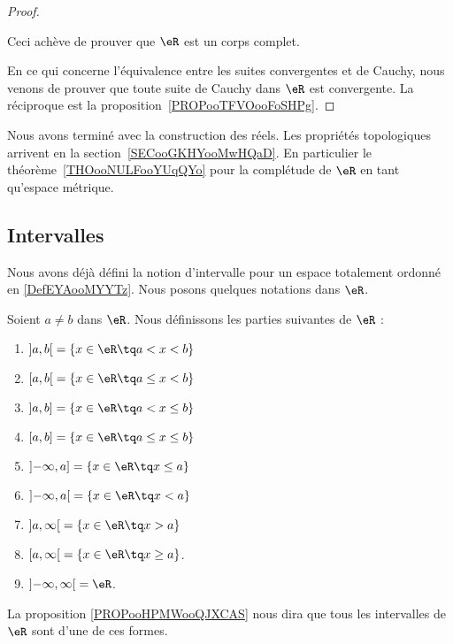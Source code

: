 \begin{proof}
\begin{subproof}
        Ceci achève de prouver que \( \eR\) est un corps complet.
        \end{subproof}

        En ce qui concerne l'équivalence entre les suites convergentes et de Cauchy, nous venons de prouver que toute suite de Cauchy dans \( \eR\) est convergente. La réciproque est la proposition~\ref{PROPooTFVOooFoSHPg}.

\end{proof}

Nous avons terminé avec la construction des réels. Les propriétés topologiques arrivent en la section~\ref{SECooGKHYooMwHQaD}. En particulier le théorème~\ref{THOooNULFooYUqQYo} pour la complétude de \( \eR\) en tant qu'espace métrique.

\subsection{Intervalles}

Nous avons déjà défini la notion d'intervalle pour un espace totalement ordonné en \ref{DefEYAooMYYTz}. Nous posons quelques notations dans \( \eR\).

\begin{definition}  \label{DEFooAQBUooKLChOW}
    Soient \( a\neq b\) dans \( \eR\). Nous définissons les parties suivantes de \( \eR\) :
    \begin{enumerate}
        \item
            \( \mathopen] a , b \mathclose[=\{ x\in \eR\tq a<x<b \}\)
        \item
            \( \mathopen[ a , b \mathclose[=\{ x\in \eR\tq a\leq x<b \}\)
            \item
            \( \mathopen] a , b \mathclose]=\{ x\in \eR\tq a<x\leq b \}\)
        \item
            \( \mathopen[ a , b \mathclose]=\{ x\in \eR\tq a\leq x\leq b \}\)
        \item
        \( \mathopen]-\infty , a \mathclose]=\{ x\in \eR\tq x\leq a \}\)
        \item
        \( \mathopen]-\infty , a \mathclose[=\{ x\in \eR\tq x< a \}\)
        \item
        \( \mathopen] a , \infty \mathclose[=\{ x\in \eR\tq x>a \}\)
        \item
            \( \mathopen[ a , \infty \mathclose[=\{ x\in \eR\tq x\geq a \}\).
            \item
            \( \mathopen] -\infty , \infty \mathclose[=\eR\).
    \end{enumerate}
    La proposition \ref{PROPooHPMWooQJXCAS} nous dira que tous les intervalles de \( \eR\) sont d'une de ces formes.
\end{definition}

